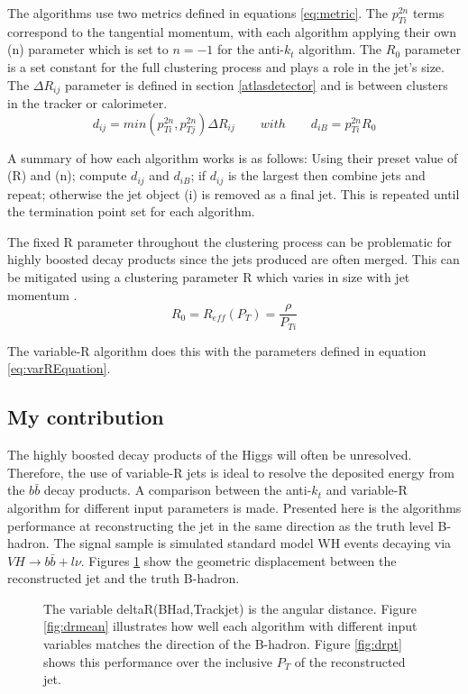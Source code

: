  The algorithms use two metrics defined in equations \ref{eq:metric}. The $p^{2n}_{Ti}$ terms correspond to the tangential momentum, with each algorithm applying their own (n) parameter which is set to $n=-1$ for the anti-$k_t$ algorithm. The $R_0$ parameter is a set constant for the full clustering process and plays a role in the jet's size. The $\Delta R_{ij}$ parameter is defined in section \ref{atlasdetector} and is between clusters in the tracker or calorimeter.
\begin{equation}
\displaystyle
d_{ij} = min(p_{Ti}^{2n},p_{Tj}^{2n})\Delta R_{ij}  \qquad  with \qquad d_{iB} = p_{Ti}^{2n}R_0 
\label{eq:metric}
\end{equation}

A summary of how each algorithm works is as follows: Using their preset value of (R) and (n); compute $d_{ij}$ and $d_{iB}$; if $d_{ij}$ is the largest then combine jets and repeat; otherwise the jet object (i) is removed as a final jet. This is repeated until the termination point set for each algorithm.

The fixed R parameter throughout the clustering process can be problematic for highly boosted decay products since the jets produced are often merged. This can be mitigated using a clustering parameter R which varies in size with jet momentum \cite{varR}.         
\begin{equation}
\displaystyle
R_{0}= R_{eff}(P_{T})=\frac{\rho}{P_{Ti}}
\label{eq:varREquation}
\end{equation}

The variable-R algorithm does this with the parameters defined in equation \ref{eq:varREquation}.

\subsection{My contribution}
The highly boosted decay products of the Higgs will often be unresolved. Therefore, the use of variable-R jets is ideal to resolve the deposited energy from the $b\bar{b}$ decay products. A comparison between the anti-$k_t$ and variable-R algorithm for different input parameters is made. Presented here is the algorithms performance at reconstructing the jet in the same direction as the truth level B-hadron. The signal sample is simulated standard model WH events decaying via $VH \rightarrow b\bar{b} + l \nu $. Figures \ref{fig:drtogether} show the geometric displacement between the reconstructed jet and the truth B-hadron.   
\begin{figure}[H]
\hspace{-2.5cm}
\caption{The variable deltaR(BHad,Trackjet) is the angular distance. Figure \ref{fig:drmean} illustrates how well each algorithm with different input variables matches the direction of the B-hadron. Figure \ref{fig:drpt} shows this performance over the inclusive $P_T$ of the reconstructed jet.}
\label{fig:drtogether}
\end{figure}

